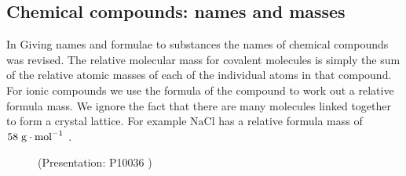             \subsection*{Chemical compounds: names and masses}
            \nopagebreak
\label{m38689*uid97124}In Giving names and formulae to substances the names of chemical compounds was revised. The relative molecular mass for covalent molecules is simply the sum of the relative atomic masses of each of the individual atoms in that compound. For ionic compounds we use the formula of the compound to work out a relative formula mass. We ignore the fact that there are many molecules linked together to form a crystal lattice. For example $\mathrm{NaCl}$ has a relative formula mass of $58\phantom{\rule{3pt}{0ex}}\mathrm{g}\ensuremath{\cdot}{\mathrm{mol}}^{-1}$ .  
    \label{m38689*eip-891}
    \setcounter{subfigure}{0}
	\begin{figure}[H] %
    \label{m38689*slidesharemedia}\label{m38689*slideshareflash} { (Presentation:  P10036 )}
      \vspace{2pt}
    \vspace{.1in}
 \end{figure}       \par \label{m38689*cid13}
